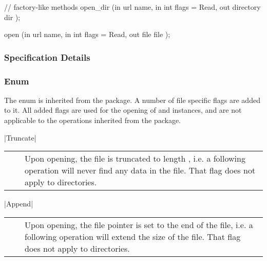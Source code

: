 \begin{myspec}
{{      // factory-like methods
      open_dir    (in    url               name,
                   in    int               flags = Read,
                   out   directory         dir      );
 
      open        (in    url               name,
                   in    int               flags = Read,
                   out   file              file     );
    }
  }
 \end{myspec}
 
 
 \subsubsection{Specification Details}
 
  \subsubsection*{Enum }
 
  The  enum is inherited from the
   package.  A number of file specific flags are
  added to it.  All added flags are used for the opening of
   and  instances, and are not applicable
  to the operations inherited from the  package.
  
    |Truncate|\\[0.3mm]
    \begin{tabular}{cp{110mm}}
      ~~ & Upon opening, the file is truncated to length 
           \T{0}, i.e. a following \T{read()} operation will 
           never find any data in the file.  That flag does not 
           apply to directories.
    \end{tabular}
 
    |Append|\\[0.3mm]
    \begin{tabular}{cp{110mm}}
      ~~ & Upon opening, the file pointer is set to the 
           end of the file, i.e. a following \T{write()} 
           operation will extend the size of the file.  That 
           flag does not apply to directories.
    \end{tabular}
 
